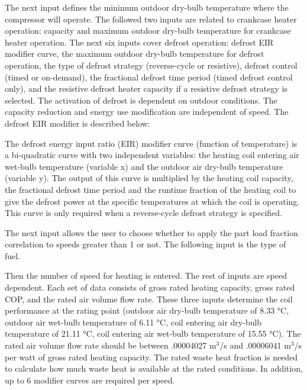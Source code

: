 The next input defines the minimum outdoor dry-bulb temperature where the compressor will operate. The followed two inputs are related to crankcase heater operation: capacity and maximum outdoor dry-bulb temperature for crankcase heater operation. The next six inputs cover defrost operation: defrost EIR modifier curve, the maximum outdoor dry-bulb temperature for defrost operation, the type of defrost strategy (reverse-cycle or resistive), defrost control (timed or on-demand), the fractional defrost time period (timed defrost control only), and the resistive defrost heater capacity if a resistive defrost strategy is selected. The activation of defrost is dependent on outdoor conditions. The capacity reduction and energy use modification are independent of speed. The defrost EIR modifier is described below:

The defrost energy input ratio (EIR) modifier curve (function of temperature) is a bi-quadratic curve with two independent variables: the heating coil entering air wet-bulb temperature (variable x) and the outdoor air dry-bulb temperature (variable y). The output of this curve is multiplied by the heating coil capacity, the fractional defrost time period and the runtime fraction of the heating coil to give the defrost power at the specific temperatures at which the coil is operating. This curve is only required when a reverse-cycle defrost strategy is specified.

The next input allows the user to choose whether to apply the part load fraction correlation to speeds greater than 1 or not. The following input is the type of fuel.

Then the number of speed for heating is entered. The rest of inputs are speed dependent. Each set of data consists of gross rated heating capacity, gross rated COP, and the rated air volume flow rate. These three inputs determine the coil performance at the rating point (outdoor air dry-bulb temperature of 8.33 °C, outdoor air wet-bulb temperature of 6.11 °C, coil entering air dry-bulb temperature of 21.11 °C, coil entering air wet-bulb temperature of 15.55 °C). The rated air volume flow rate should be between .00004027 m\(^{3}\)/s and .00006041 m\(^{3}\)/s per watt of gross rated heating capacity. The rated waste heat fraction is needed to calculate how much waste heat is available at the rated conditions. In addition, up to 6 modifier curves are required per speed.

